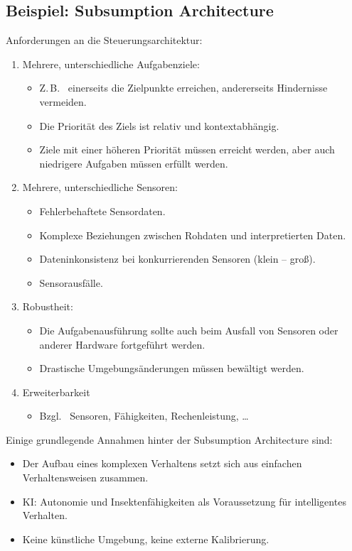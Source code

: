 \documentclass[a4paper, 11pt, accentcolor = tud3b]{tudreport}
\begin{document}
			\subsection{Beispiel: Subsumption Architecture}
				Anforderungen an die Steuerungsarchitektur:
				\begin{enumerate}
					\item Mehrere, unterschiedliche Aufgabenziele:
						\begin{itemize}
							\item Z.\,B.~ einerseits die Zielpunkte erreichen, andererseits Hindernisse vermeiden.
							\item Die Priorität des Ziels ist relativ und kontextabhängig.
							\item Ziele mit einer höheren Priorität müssen erreicht werden, aber auch niedrigere Aufgaben müssen erfüllt werden.
						\end{itemize}
					\item Mehrere, unterschiedliche Sensoren:
						\begin{itemize}
							\item Fehlerbehaftete Sensordaten.
							\item Komplexe Beziehungen zwischen Rohdaten und interpretierten Daten.
							\item Dateninkonsistenz bei konkurrierenden Sensoren (klein -- groß).
							\item Sensorausfälle.
						\end{itemize}
					\item Robustheit:
						\begin{itemize}
							\item Die Aufgabenausführung sollte auch beim Ausfall von Sensoren oder anderer Hardware fortgeführt werden.
							\item Drastische Umgebungsänderungen müssen bewältigt werden.
						\end{itemize}
					\item Erweiterbarkeit
						\begin{itemize}
							\item Bzgl.~ Sensoren, Fähigkeiten, Rechenleistung, \dots
						\end{itemize}
				\end{enumerate}
			
				Einige grundlegende Annahmen hinter der Subsumption Architecture sind:
				\begin{itemize}
					\item Der Aufbau eines komplexen Verhaltens setzt sich aus einfachen Verhaltensweisen zusammen.
					\item KI: Autonomie und Insektenfähigkeiten als Voraussetzung für intelligentes Verhalten.
					\item Keine künstliche Umgebung, keine externe Kalibrierung.
				\end{itemize}
			
\end{document}
